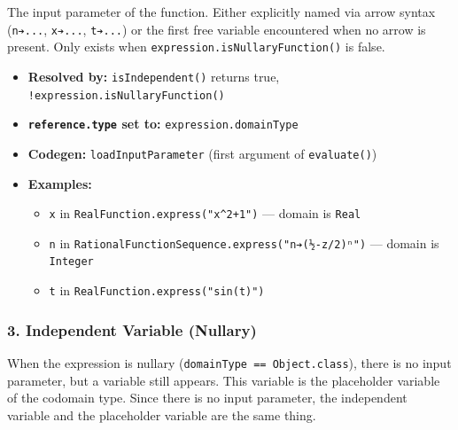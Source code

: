 \documentclass[
]{article}
\providecommand{\tightlist}{%
  \setlength{\itemsep}{0pt}\setlength{\parskip}{0pt}}
\begin{document}
The input parameter of the function. Either explicitly named via arrow
syntax (\texttt{n➔...}, \texttt{x➔...}, \texttt{t➔...}) or the first
free variable encountered when no arrow is present. Only exists when
\texttt{expression.isNullaryFunction()} is false.

\begin{itemize}
\tightlist
\item
  \textbf{Resolved by:} \texttt{isIndependent()} returns true,
  \texttt{!expression.isNullaryFunction()}
\item
  \textbf{\texttt{reference.type} set to:}
  \texttt{expression.domainType}
\item
  \textbf{Codegen:} \texttt{loadInputParameter} (first argument of
  \texttt{evaluate()})
\item
  \textbf{Examples:}

  \begin{itemize}
  \tightlist
  \item
    \texttt{x} in \texttt{RealFunction.express("x\^{}2+1")} --- domain
    is \texttt{Real}
  \item
    \texttt{n} in
    \texttt{RationalFunctionSequence.express("n➔(½-z/2)ⁿ")} --- domain
    is \texttt{Integer}
  \item
    \texttt{t} in \texttt{RealFunction.express("sin(t)")}
  \end{itemize}
\end{itemize}

\subsubsection{3. Independent Variable
(Nullary)}\label{independent-variable-nullary}

When the expression is nullary (\texttt{domainType\ ==\ Object.class}),
there is no input parameter, but a variable still appears. This variable
is the placeholder variable of the codomain type. Since there is no
input parameter, the independent variable and the placeholder variable
are the same thing.
\end{document}
